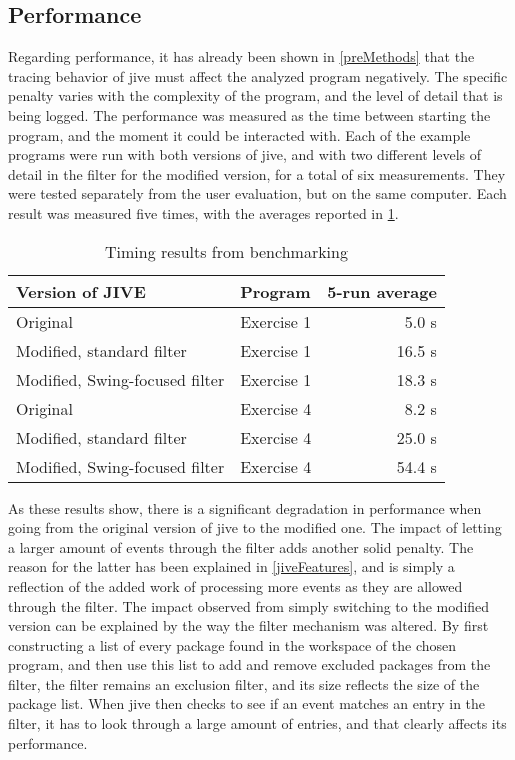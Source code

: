 \subsection{Performance}\label{jiveEvalPerf}
Regarding performance, it has already been shown in \cref{preMethods} that the tracing behavior of \gls{jive} must affect the analyzed program negatively.
The specific penalty varies with the complexity of the program, and the level of detail that is being logged.
The performance was measured as the time between starting the program, and the moment it could be interacted with.
Each of the example programs were run with both versions of \gls{jive}, and with two different levels of detail in the filter for the modified version, for a total of six measurements.
They were tested separately from the user evaluation, but on the same computer.
Each result was measured five times, with the averages reported in \cref{tab:testPerf}.



\begin{table}[H]
	\begin{center}
		\caption{Timing results from benchmarking}
		\label{tab:testPerf}
		\begin{tabular}{llr}
			\hline
			Version of JIVE & Program & 5-run average\\ \hline
			Original& Exercise 1 & 5.0 s\\
			Modified, standard filter & Exercise 1 & 16.5 s\\
			Modified, Swing-focused filter & Exercise 1 & 18.3 s\\
			Original& Exercise 4 & 8.2 s\\ 
			Modified, standard filter & Exercise 4 & 25.0 s\\ 
			Modified, Swing-focused filter & Exercise 4 & 54.4 s\\ \hline
		\end{tabular}
	\end{center}
\end{table}

As these results show, there is a significant degradation in performance when going from the original version of \gls{jive} to the modified one.
The impact of letting a larger amount of events through the filter adds another solid penalty.
The reason for the latter has been explained in \cref{jiveFeatures}, and is simply a reflection of the added work of processing more events as they are allowed through the filter.
The impact observed from simply switching to the modified version can be explained by the way the filter mechanism was altered.
By first constructing a list of every package found in the workspace of the chosen program, and then use this list to add and remove excluded packages from the filter, the filter remains an exclusion filter, and its size reflects the size of the package list.
When \gls{jive} then checks to see if an event matches an entry in the filter, it has to look through a large amount of entries, and that clearly affects its performance.

